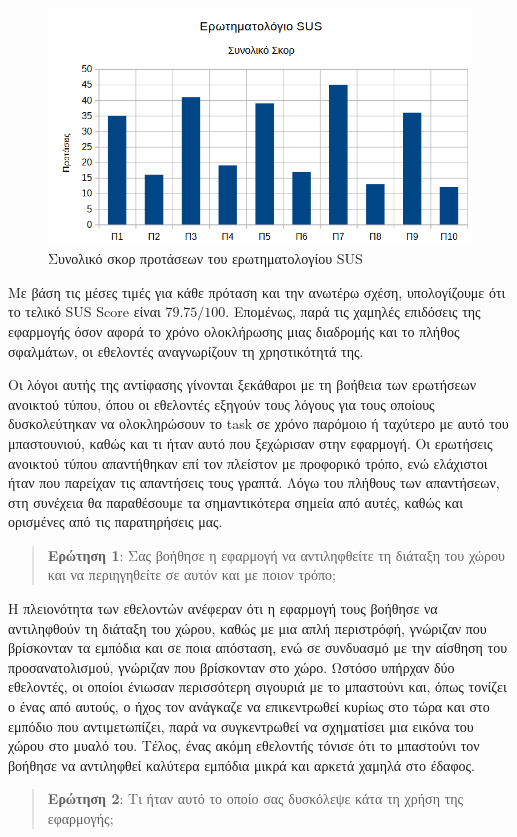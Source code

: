 \begin{figure}[!ht]
    \centering
    \includegraphics[width=1\textwidth]{./images/questionnaireSUSTotalScore.png}
    \caption{Συνολικό σκορ προτάσεων του ερωτηματολογίου SUS}\label{fig:questionnaireSUSTotalScore}
\end{figure}

Με βάση τις μέσες τιμές για κάθε πρόταση και την ανωτέρω σχέση, υπολογίζουμε ότι το τελικό SUS Score είναι $79.75 / 100$. Επομένως, παρά τις χαμηλές επιδόσεις της εφαρμογής όσον αφορά το χρόνο ολοκλήρωσης μιας διαδρομής και το πλήθος σφαλμάτων, οι εθελοντές αναγνωρίζουν τη χρηστικότητά της.

Οι λόγοι αυτής της αντίφασης γίνονται ξεκάθαροι με τη βοήθεια των ερωτήσεων ανοικτού τύπου, όπου οι εθελοντές εξηγούν τους λόγους για τους οποίους δυσκολεύτηκαν να ολοκληρώσουν το task σε χρόνο παρόμοιο ή ταχύτερο με αυτό του μπαστουνιού, καθώς και τι ήταν αυτό που ξεχώρισαν στην εφαρμογή. Οι ερωτήσεις ανοικτού τύπου απαντήθηκαν επί τον πλείστον με προφορικό τρόπο, ενώ ελάχιστοι ήταν που παρείχαν τις απαντήσεις τους γραπτά. Λόγω του πλήθους των απαντήσεων, στη συνέχεια θα παραθέσουμε τα σημαντικότερα σημεία από αυτές, καθώς και ορισμένες από τις παρατηρήσεις μας.
\\[\baselineskip]
\begin{quote}
    \textbf{Ερώτηση 1}: Σας βοήθησε η εφαρμογή να αντιληφθείτε τη διάταξη του χώρου και να περιηγηθείτε σε αυτόν και με ποιον τρόπο;
\end{quote}

Η πλειονότητα των εθελοντών ανέφεραν ότι η εφαρμογή τους βοήθησε να αντιληφθούν τη διάταξη του χώρου, καθώς με μια απλή περιστρόφή, γνώριζαν που βρίσκονταν τα εμπόδια και σε ποια απόσταση, ενώ σε συνδυασμό με την αίσθηση του προσανατολισμού, γνώριζαν που βρίσκονταν στο χώρο. Ωστόσο υπήρχαν δύο εθελοντές, οι οποίοι ένιωσαν περισσότερη σιγουριά με το μπαστούνι και, όπως τονίζει ο ένας από αυτούς, ο ήχος τον ανάγκαζε να επικεντρωθεί κυρίως στο τώρα και στο εμπόδιο που αντιμετωπίζει, παρά να συγκεντρωθεί να σχηματίσει μια εικόνα του χώρου στο μυαλό του. Τέλος, ένας ακόμη εθελοντής τόνισε ότι το μπαστούνι τον βοήθησε να αντιληφθεί καλύτερα εμπόδια μικρά και αρκετά χαμηλά στο έδαφος.
\\[\baselineskip]
\begin{quote}
    \textbf{Ερώτηση 2}: Τι ήταν αυτό το οποίο σας δυσκόλεψε κάτα τη χρήση της εφαρμογής;
\end{quote}

